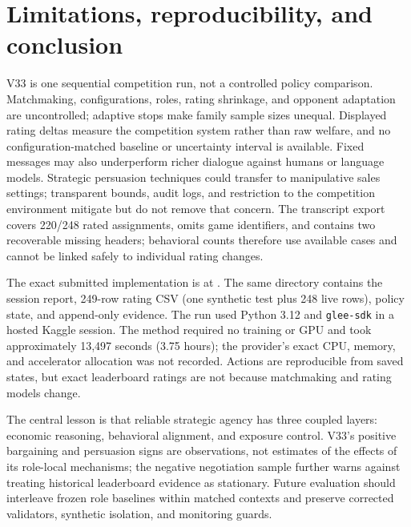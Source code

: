 \section{Limitations, reproducibility, and conclusion}

V33 is one sequential competition run, not a controlled policy comparison.
Matchmaking, configurations, roles, rating shrinkage, and opponent adaptation
are uncontrolled; adaptive stops make family sample sizes unequal. Displayed
rating deltas measure the competition system rather than raw welfare, and no
configuration-matched baseline or uncertainty interval is available. Fixed
messages may also underperform richer dialogue against humans or language
models. Strategic persuasion techniques could transfer to manipulative sales
settings; transparent bounds, audit logs, and restriction to the competition
environment mitigate but do not remove that concern.
The transcript export covers 220/248 rated assignments, omits game identifiers,
and contains two recoverable missing headers; behavioral counts therefore use
available cases and cannot be linked safely to individual rating changes.

The exact submitted implementation is
at \CodeURL. The same directory contains the session report, 249-row rating
CSV (one synthetic test plus 248 live rows), policy state, and append-only
evidence. The run used Python 3.12 and \texttt{glee-sdk} in a hosted Kaggle
session. The method required no training or GPU and took approximately 13,497
seconds (3.75 hours); the provider's exact CPU, memory, and accelerator
allocation was not recorded.
Actions are reproducible from saved states, but exact leaderboard ratings are
not because matchmaking and rating models change.

The central lesson is that reliable strategic agency has three coupled layers:
economic reasoning, behavioral alignment, and exposure control. V33's positive
bargaining and persuasion signs are observations, not estimates of the effects
of its role-local mechanisms; the negative negotiation sample further warns
against treating historical leaderboard evidence as stationary. Future
evaluation should interleave frozen role baselines within matched contexts and
preserve corrected validators, synthetic isolation, and monitoring guards.
